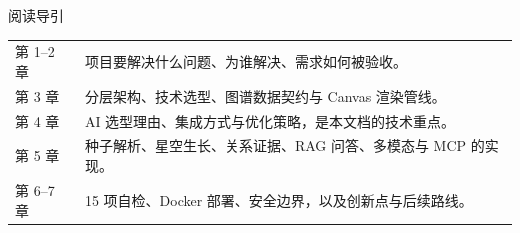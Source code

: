 \thispagestyle{plain}
\tableofcontents

\vfill
\begin{designbox}{阅读导引}
\begin{tabularx}{\textwidth}{L{4.2cm}Y}
第 1--2 章 & 项目要解决什么问题、为谁解决、需求如何被验收。\\
第 3 章 & 分层架构、技术选型、图谱数据契约与 Canvas 渲染管线。\\
第 4 章 & AI 选型理由、集成方式与优化策略，是本文档的技术重点。\\
第 5 章 & 种子解析、星空生长、关系证据、RAG 问答、多模态与 MCP 的实现。\\
第 6--7 章 & 15 项自检、Docker 部署、安全边界，以及创新点与后续路线。\\
\end{tabularx}
\end{designbox}

\newpage
